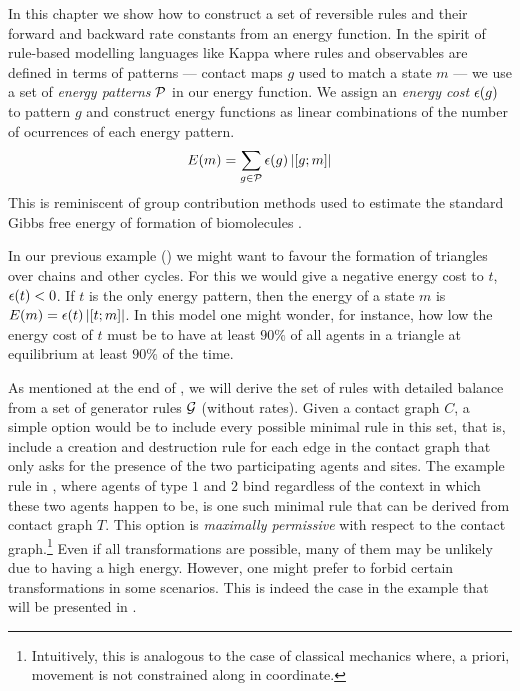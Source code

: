 In this chapter we show how to construct a set of reversible rules
and their forward and backward rate constants from an energy function.
In the spirit of rule-based modelling languages like Kappa
where rules and observables are defined in terms of patterns ---
contact maps $g$ used to match a state $m$ ---
we use a set of \emph{energy patterns} $\mathcal{P}$
in our energy function.
We assign an \emph{energy cost} $\epsilon(g)$ to pattern $g$
and construct energy functions as linear combinations
of the number of ocurrences of each energy pattern.
\[ E(m) = \sum_{g \in \mathcal{P}} \epsilon(g) \left\lvert \left[g;m\right] \right\rvert \]
This is reminiscent of group contribution methods
used to estimate the standard Gibbs free energy of formation
of biomolecules \citep{group-contrib}.

In our previous example () we might want to favour
the formation of triangles over chains and other cycles.
For this we would give a negative energy cost to $t$,
\ie $\epsilon(t) < 0$.
If $t$ is the only energy pattern,
then the energy of a state $m$ is
$E(m) = \epsilon(t) \left\lvert \left[t;m\right] \right\rvert$.
In this model one might wonder, for instance,
how low the energy cost of $t$ must be
to have at least $90\%$ of all agents in a triangle
at equilibrium at least $90\%$ of the time.

As mentioned at the end of ,
we will derive the set of rules with detailed balance
from a set of generator rules $\mathcal{G}$ (without rates).
Given a contact graph $C$,
a simple option would be to include
every possible minimal rule in this set,
that is, include a creation and destruction rule
for each edge in the contact graph
that only asks for the presence of
the two participating agents and sites.
The example rule in ,
where agents of type $1$ and $2$ bind
regardless of the context
in which these two agents happen to be,
is one such minimal rule
that can be derived from contact graph $T$.
This option is \emph{maximally permissive}
with respect to the contact graph.\footnote{
  Intuitively, this is analogous to the case of classical mechanics
  where, a priori, movement is not constrained along in coordinate.}
Even if all transformations are possible,
many of them may be unlikely due to having a high energy.
However, one might prefer to forbid certain transformations
in some scenarios.
This is indeed the case in the example
that will be presented in .







